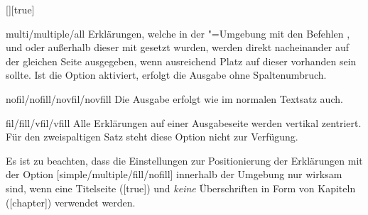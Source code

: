 \begin{Declaration}{[\PSet]}[true]
\begin{values}
\item[multi/multiple/all]
  Erklärungen, welche in der "=Umgebung mit den 
  Befehlen ,  und  oder 
  außerhalb dieser mit  gesetzt wurden, werden direkt 
  nacheinander auf der gleichen Seite ausgegeben, wenn ausreichend Platz auf 
  dieser vorhanden sein sollte. Ist die Option  aktiviert, 
  erfolgt die Ausgabe ohne Spaltenumbruch.
\item[nofil/nofill/novfil/novfill]
  Die Ausgabe erfolgt wie im normalen Textsatz auch.
\item[fil/fill/vfil/vfill]
  Alle Erklärungen auf einer Ausgabeseite werden vertikal zentriert. Für 
  den zweispaltigen Satz steht diese Option nicht zur Verfügung.
\end{values}
%
Es ist zu beachten, dass die Einstellungen zur Positionierung der Erklärungen 
mit der Option [simple/multiple/fill/nofill] innerhalb der 
Umgebung  nur wirksam sind, wenn eine Titelseite 
([true]) und \emph{keine} Überschriften in Form von Kapiteln 
([chapter]) verwendet werden.
\end{Declaration}

